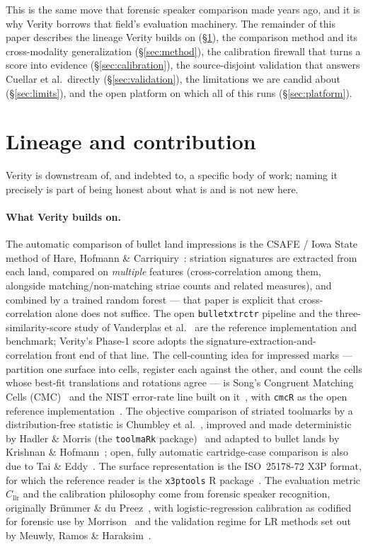 \documentclass[11pt]{article}
\newcommand{\Cllr}{C_{\mathrm{llr}}}
\newcommand{\code}[1]{\texttt{#1}}
\begin{document}
This is the same move that forensic speaker comparison made years ago, and it is
why Verity borrows that field's evaluation machinery. The remainder of this paper
describes the lineage Verity builds on (\S\ref{sec:lineage}), the comparison
method and its cross-modality generalization (\S\ref{sec:method}), the calibration
firewall that turns a score into evidence (\S\ref{sec:calibration}), the
source-disjoint validation that answers Cuellar et al.\ directly
(\S\ref{sec:validation}), the limitations we are candid about (\S\ref{sec:limits}),
and the open platform on which all of this runs (\S\ref{sec:platform}).

\section{Lineage and contribution}
\label{sec:lineage}

Verity is downstream of, and indebted to, a specific body of work; naming it
precisely is part of being honest about what is and is not new here.

\paragraph{What Verity builds on.}
The automatic comparison of bullet land impressions is the CSAFE / Iowa State
method of Hare, Hofmann \& Carriquiry~\cite{hare2017}: striation signatures are
extracted from each land, compared on \emph{multiple} features (cross-correlation
among them, alongside matching/non-matching striae counts and related measures),
and combined by a trained random forest --- that paper is explicit that
cross-correlation alone does not suffice. The open \code{bulletxtrctr} pipeline
and the three-similarity-score study of Vanderplas et al.~\cite{vanderplas2020}
are the reference implementation and benchmark; Verity's Phase-1 score adopts the
signature-extraction-and-correlation front end of that line. The cell-counting idea
for impressed marks
--- partition one surface into cells, register each against the other, and count
the cells whose best-fit translations and rotations agree --- is Song's Congruent
Matching Cells (CMC)~\cite{song2013} and the NIST error-rate line built on
it~\cite{song2018}, with \code{cmcR} as the open reference
implementation~\cite{zemmels2023}. The objective comparison of striated toolmarks by a
distribution-free statistic is Chumbley et al.~\cite{chumbley2010}, improved and
made deterministic by Hadler \& Morris (the \code{toolmaRk}
package)~\cite{hadler2018} and adapted to bullet lands by Krishnan \&
Hofmann~\cite{krishnan2019}; open, fully automatic cartridge-case comparison is
also due to Tai \& Eddy~\cite{tai2018}. The surface
representation is the ISO~25178-72 X3P format, for which the reference reader is the
\code{x3ptools} R package~\cite{x3ptools2024}. The evaluation metric $\Cllr$ and the
calibration philosophy come from forensic speaker recognition, originally
Br\"ummer \& du Preez~\cite{brummer2006}, with logistic-regression calibration as
codified for forensic use by Morrison~\cite{morrison2013} and the validation
regime for LR methods set out by Meuwly, Ramos \& Haraksim~\cite{meuwly2017}.
\end{document}
